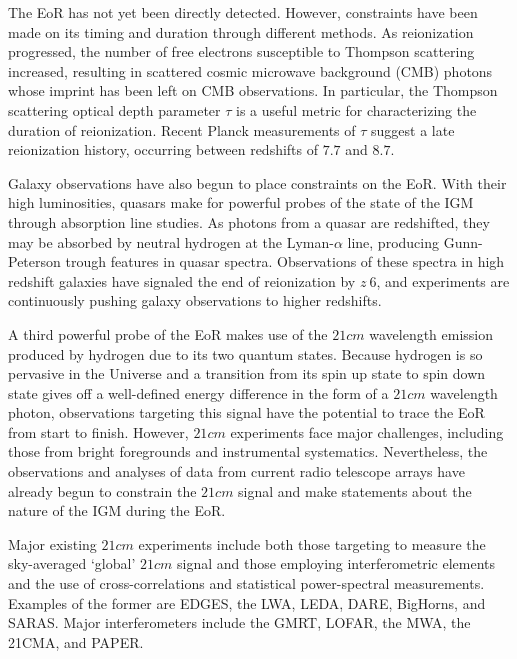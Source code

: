 \documentclass[preprint2,numberedappendix,tighten,twocolappendix]{aastex6}  %
\begin{document}
The EoR has not yet been directly detected. However, constraints have been made on its timing and duration through different methods. As reionization progressed, the number of free electrons susceptible to Thompson scattering increased, resulting in scattered cosmic microwave background (CMB) photons whose imprint has been left on CMB observations. In particular, the Thompson scattering optical depth parameter $\tau$ is a useful metric for characterizing the duration of reionization. Recent Planck measurements of $\tau$ suggest a late reionization history, occurring between redshifts of $7.7$ and $8.7$.

Galaxy observations have also begun to place constraints on the EoR. With their high luminosities, quasars make for powerful probes of the state of the IGM through absorption line studies. As photons from a quasar are redshifted, they may be absorbed by neutral hydrogen at the Lyman-$\alpha$ line, producing Gunn-Peterson trough features in quasar spectra. Observations of these spectra in high redshift galaxies have signaled the end of reionization by $z ~ 6$, and experiments are continuously pushing galaxy observations to higher redshifts. 

A third powerful probe of the EoR makes use of the $21 cm$ wavelength emission produced by hydrogen due to its two quantum states. Because hydrogen is so pervasive in the Universe and a transition from its spin up state to spin down state gives off a  well-defined energy difference in the form of a $21 cm$ wavelength photon, observations targeting this signal have the potential to trace the EoR from start to finish. However, $21 cm$ experiments face major challenges, including those from bright foregrounds and instrumental systematics. Nevertheless, the observations and analyses of data from current radio telescope arrays have already begun to constrain the $21 cm$ signal and make statements about the nature of the IGM during the EoR. 

Major existing $21 cm$ experiments include both those targeting to measure the sky-averaged `global' $21 cm$ signal and those employing interferometric elements and the use of cross-correlations and statistical power-spectral measurements. Examples of the former are EDGES, the LWA, LEDA, DARE, BigHorns, and SARAS. Major interferometers include the GMRT, LOFAR, the MWA, the 21CMA, and PAPER.
\end{document}
